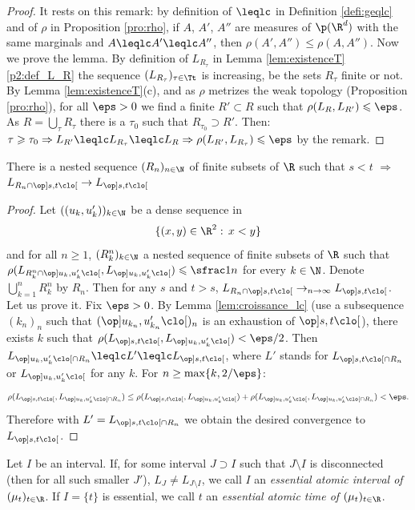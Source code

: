 \begin{proof} It rests on this remark: by definition of $\leqlc$ in Definition \ref{defi:geqlc} and of $\rho$ in Proposition \ref{pro:rho}, if $A$, $A'$, $A''$ are measures of $\p(\R^d)$ with the same marginals and $A\leqlc A'\leqlc A''$, then $\rho(A',A'')\leqslant\rho(A,A'')$. Now we prove the lemma. By definition of $L_{R_\tau}$ in Lemma \ref{lem:existenceT}\eqref{p2:def_L_R} the sequence $(L_{R_\tau})_{\tau\in\Tt}$ is increasing, be the sets $R_\tau$ finite or not. By Lemma \ref{lem:existenceT}(c), and as $\rho$ metrizes the weak topology (Proposition \ref{pro:rho}), for all $\eps>0$ we find a finite $R'\subset R$ such that $\rho(L_R,L_{R'})\leqslant\eps$. As $R=\bigcup_\tau R_\tau$ there is a $\tau_0$ such that $R_{\tau_0}\supset R'$. Then: $\tau\geqslant \tau_0\Rightarrow L_{R'}\leqlc L_{R_\tau}\leqlc L_{R}\Rightarrow \rho(L_{R'},L_{R_\tau})\leqslant\eps$ by the remark.
\end{proof}

\begin{lem}\label{lem:convergence_couples}
There is a nested sequence $(R_n)_{n\in\N}$ of finite subsets of $\R$ such that $s<t$ $\Rightarrow$ $L_{R_n\cap\op]s,t\clo[}\to L_{\op]s,t\clo[}$
\end{lem}
\begin{proof} Let $((u_k,u'_k))_{k\in\N}$ be a dense sequence in
\[
\{(x,y)\in\R^2:\,x< y\}
\]
and for all $n\geq 1$, $(R_k^n)_{k\in\N}$ a nested sequence of finite subsets of $\R$ such that $\rho(L_{R_k^n\cap\op]u_k,u'_k\clo[},L_{\op]u_k,u'_k\clo[})\leqslant\sfrac1n$ for every $k\in \N$. Denote $\bigcup_{k=1}^n R^n_k$ by $R_n$. Then for any $s$ and $t>s$, $L_{R_n\cap\op]s,t\clo[}\to_{n\to\infty}L_{\op]s,t\clo[}$. Let us prove it. Fix $\eps>0$. By Lemma \ref{lem:croissance_lc} (use a subsequence $(k_n)_n$ such that $(\op]u_{k_n},u'_{k_n}\clo[)_n$ is an exhaustion of $\op]s,t\clo[$), there exists $k$ such that $\rho(L_{\op]s,t\clo[},L_{\op]u_k,u'_k\clo[})<\eps/2$. Then $L_{\op]u_k,u_k'\clo[\cap R_n}\leqlc L' \leqlc L_{\op]s,t\clo[}$, where $L'$ stands for $L_{\op]s,t\clo[\cap R_n}$ or $L_{\op]u_k,u_k'\clo[}$ for any $k$. For $n\geq\max\{k,2/\eps\}$:
\[\rho(L_{\op]s,t\clo[},L_{\op]u_k,u'_k\clo[\cap R_n})\leq \rho(L_{\op]s,t\clo[},L_{\op]u_k,u'_k\clo[})+ \rho(L_{\op]u_k,u'_k\clo[},L_{\op]u_k,u'_k\clo[\cap R_n})<\eps.\]
Therefore with $L'=L_{\op]s,t\clo[\cap R_n}$ we obtain the desired convergence to $L_{\op]s,t\clo[}$.
\end{proof}

\begin{defi}\label{defi:essentiel}Let $I$ be an interval. If, for some interval $J\supset I$ such that $J\setminus I$ is disconnected (then for all such smaller $J'$), $L_{J}\neq L_{J\setminus I}$, we call $I$ an \emph{essential atomic interval of $(\mu_t)_{t\in\R}$}. If $I=\{t\}$ is essential, we call $t$ an \emph{essential atomic time of $(\mu_t)_{t\in\R}$}.
\end{defi}

